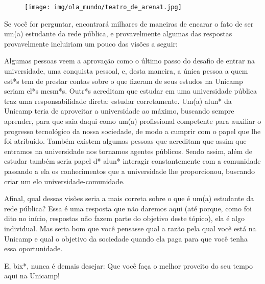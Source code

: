 \begin{figure}[h!]
    \centering
    \texttt{[image: img/ola\_mundo/teatro\_de\_arena1.jpg]}
\end{figure}

Se você for perguntar, encontrará milhares de maneiras de encarar o fato de ser
um(a) estudante da rede pública, e provavelmente algumas das respostas
provavelmente incluiriam um pouco das visões a seguir:

Algumas pessoas veem a aprovação como o último passo do desafio de entrar na
universidade, uma conquista pessoal, e, desta maneira, a única pessoa a quem
est*s tem de prestar contas sobre o que fizeram de seus estudos na Unicamp
seriam el*s mesm*s. Outr*s acreditam que estudar em uma universidade pública
traz uma responsabilidade direta: estudar corretamente. Um(a) alun* da Unicamp
teria de aproveitar a universidade ao máximo, buscando sempre aprender, para
que saia daqui como um(a) profissional competente para auxiliar o progresso
tecnológico da nossa sociedade, de modo a cumprir com o papel que lhe foi
atribuído. Também existem algumas pessoas que acreditam que assim que entramos
na universidade nos tornamos agentes públicos. Sendo assim, além de estudar
também seria papel d* alun* interagir constantemente com a comunidade passando
a ela os conhecimentos que a universidade lhe proporcionou, buscando criar um
elo universidade-comunidade.

Afinal, qual dessas visões seria a mais correta sobre o que é um(a) estudante
da rede pública? Essa é uma resposta que não daremos aqui (até porque, como
foi dito no início, respostas não fazem parte do objetivo deste tópico), ela é
algo individual. Mas seria bom que você pensasse qual a razão pela qual você
está na Unicamp e qual o objetivo da sociedade quando ela paga para que você
tenha essa oportunidade.

E, bix*, nunca é demais desejar: Que você faça o melhor proveito do seu tempo
aqui na Unicamp!
